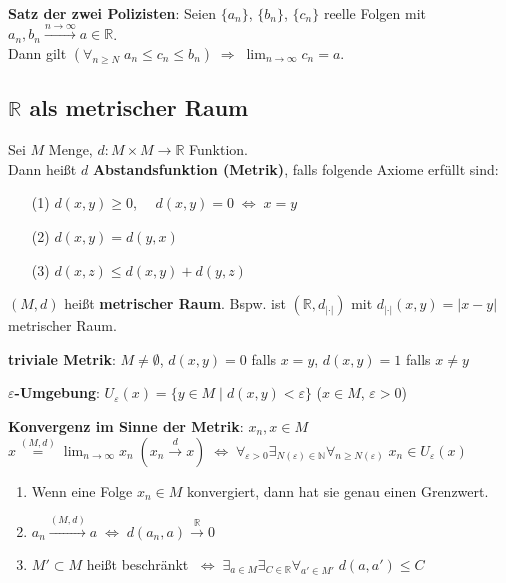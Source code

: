 \textbf{Satz der zwei Polizisten}: Seien $\{a_n\}$, $\{b_n\}$, $\{c_n\}$
reelle Folgen mit $a_n, b_n \xrightarrow{n \to \infty} a \in \mathbb{R}$. \\
Dann gilt
$(\forall_{n \ge N}\; a_n \le c_n \le b_n) \;\Rightarrow\;
\lim_{n \to \infty} c_n = a$.

\subsection{%
    \texorpdfstring{$\mathbb{R}$ als metrischer Raum}{ℝ als metrischer Raum}%
}

Sei $M$ Menge, $d: M \times M \rightarrow \mathbb{R}$ Funktion. \\
Dann heißt $d$ \textbf{Abstandsfunktion (Metrik)}, falls folgende Axiome
erfüllt sind:

\begin{itemize}
    \item[(1)] $d(x,y) \ge 0$, $\quad d(x,y) = 0 \;\Leftrightarrow\; x = y$
    \item[(2)] $d(x,y) = d(y,x)$
    \item[(3)] $d(x,z) \le d(x,y) + d(y,z)$
\end{itemize}

$(M,d)$ heißt \textbf{metrischer Raum}. Bspw. ist $(\mathbb{R},d_{|\cdot|})$
mit $d_{|\cdot|}(x,y) = |x - y|$ metrischer Raum.

\textbf{triviale Metrik}:
$M \not= \emptyset$, $d(x,y) = 0$ falls $x = y$, $d(x,y) = 1$ falls $x \not= y$

\textbf{$\varepsilon$-Umgebung}:
$U_\varepsilon(x) = \{y \in M \;|\; d(x,y) < \varepsilon\}$
($x \in M$, $\varepsilon > 0$)

\linie

\textbf{Konvergenz im Sinne der Metrik}: $x_n, x \in M$ \\
$x \overset{(M,d)}{=} \lim_{n \to \infty} x_n \; (x_n \xrightarrow{d} x)
\;\Leftrightarrow\;
\forall_{\varepsilon > 0} \exists_{N(\varepsilon) \in \mathbb{N}}
\forall_{n \ge N(\varepsilon)}\; x_n \in U_\varepsilon(x)$

\begin{enumerate}
    \item Wenn eine Folge $x_n \in M$
    konvergiert, dann hat sie genau einen Grenzwert.

    \item $a_n \xrightarrow{(M,d)} a \;\Leftrightarrow\;
    d(a_n, a) \xrightarrow{\mathbb{R}} 0$

    \item $M' \subset M$ heißt beschränkt $\;\Leftrightarrow\;
    \exists_{a \in M} \exists_{C \in \mathbb{R}} \forall_{a' \in M'}\;
    d(a, a') \le C$
\end{enumerate}

